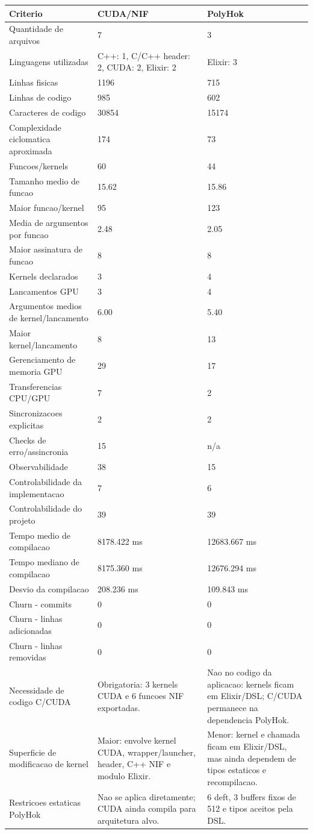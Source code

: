 \begin{tabular}{p{}p{}p{}}
\hline
Criterio & CUDA/NIF & PolyHok \\
\hline
Quantidade de arquivos & 7 & 3 \\
Linguagens utilizadas & C++: 1, C/C++ header: 2, CUDA: 2, Elixir: 2 & Elixir: 3 \\
Linhas fisicas & 1196 & 715 \\
Linhas de codigo & 985 & 602 \\
Caracteres de codigo & 30854 & 15174 \\
Complexidade ciclomatica aproximada & 174 & 73 \\
Funcoes/kernels & 60 & 44 \\
Tamanho medio de funcao & 15.62 & 15.86 \\
Maior funcao/kernel & 95 & 123 \\
Media de argumentos por funcao & 2.48 & 2.05 \\
Maior assinatura de funcao & 8 & 8 \\
Kernels declarados & 3 & 4 \\
Lancamentos GPU & 3 & 4 \\
Argumentos medios de kernel/lancamento & 6.00 & 5.40 \\
Maior kernel/lancamento & 8 & 13 \\
Gerenciamento de memoria GPU & 29 & 17 \\
Transferencias CPU/GPU & 7 & 2 \\
Sincronizacoes explicitas & 2 & 2 \\
Checks de erro/assincronia & 15 & n/a \\
Observabilidade & 38 & 15 \\
Controlabilidade da implementacao & 7 & 6 \\
Controlabilidade do projeto & 39 & 39 \\
Tempo medio de compilacao & 8178.422 ms & 12683.667 ms \\
Tempo mediano de compilacao & 8175.360 ms & 12676.294 ms \\
Desvio da compilacao & 208.236 ms & 109.843 ms \\
Churn - commits & 0 & 0 \\
Churn - linhas adicionadas & 0 & 0 \\
Churn - linhas removidas & 0 & 0 \\
Necessidade de codigo C/CUDA & Obrigatoria: 3 kernels CUDA e 6 funcoes NIF exportadas. & Nao no codigo da aplicacao: kernels ficam em Elixir/DSL; C/CUDA permanece na dependencia PolyHok. \\
Superficie de modificacao de kernel & Maior: envolve kernel CUDA, wrapper/launcher, header, C++ NIF e modulo Elixir. & Menor: kernel e chamada ficam em Elixir/DSL, mas ainda dependem de tipos estaticos e recompilacao. \\
Restricoes estaticas PolyHok & Nao se aplica diretamente; CUDA ainda compila para arquitetura alvo. & 6 deft, 3 buffers fixos de 512 e tipos aceitos pela DSL. \\
\hline
\end{tabular}

